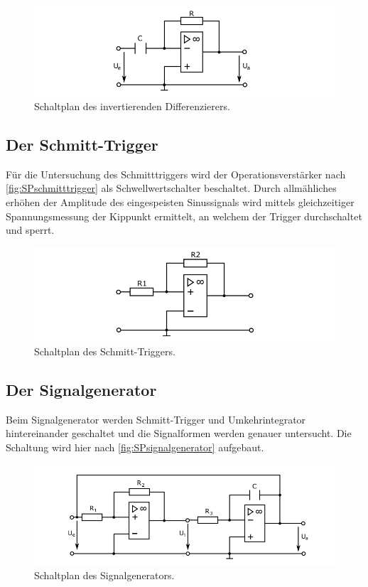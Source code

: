   \begin{figure}
    \centering
    \includegraphics[width=1\textwidth]{content/grafiken/SPumkehrdifferenzierer.PNG}
    \caption{Schaltplan des invertierenden Differenzierers.}
    \label{fig:SPumkehrdifferenzierer}
  \end{figure}



\subsection{Der Schmitt-Trigger}
Für die Untersuchung des Schmitttriggers wird der Operationsverstärker nach \autoref{fig:SPschmitttrigger}
als Schwellwertschalter beschaltet. Durch allmähliches erhöhen der Amplitude des eingespeisten Sinussignals 
wird mittels gleichzeitiger Spannungsmessung der Kippunkt ermittelt, an welchem der Trigger durchschaltet und 
sperrt.
\begin{figure}
    \centering
    \includegraphics[width=1\textwidth]{content/grafiken/SPschmitttrigger.PNG}
    \caption{Schaltplan des Schmitt-Triggers.}
    \label{fig:SPschmitttrigger}
  \end{figure}




\subsection{Der Signalgenerator}
Beim Signalgenerator werden Schmitt-Trigger und Umkehrintegrator hintereinander geschaltet und 
die Signalformen werden genauer untersucht. Die Schaltung wird hier nach \autoref{fig:SPsignalgenerator}
aufgebaut.

\begin{figure}
    \centering
    \includegraphics[width=1\textwidth]{content/grafiken/SPsignalgenerator.PNG}
    \caption{Schaltplan des Signalgenerators.}
    \label{fig:SPsignalgenerator}
  \end{figure}

